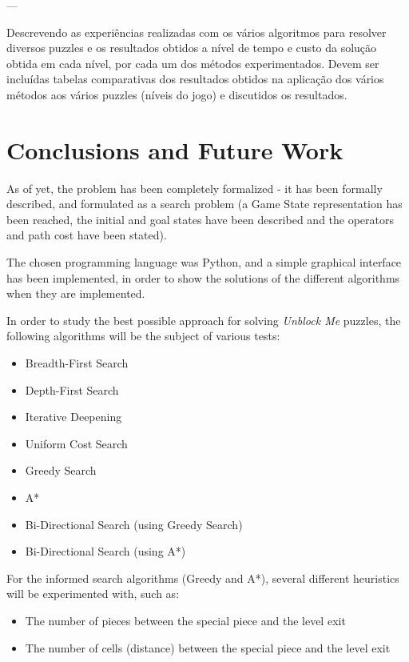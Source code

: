 \documentclass[conference]{IEEEtran}
\begin{document}
---

Descrevendo as experiências realizadas com os vários algoritmos para resolver diversos puzzles e os resultados obtidos a nível de tempo e custo da solução obtida em cada nível, por cada um dos métodos experimentados. Devem ser incluídas tabelas comparativas dos resultados obtidos na aplicação dos vários métodos aos vários puzzles (níveis do jogo) e discutidos os resultados.

\section{Conclusions and Future Work}
As of yet, the problem has been completely formalized - it has been formally described, and formulated as a search problem (a Game State representation has been reached, the initial and goal states have been described and the operators and path cost have been stated).

The chosen programming language was Python, and a simple graphical interface has been implemented, in order to show the solutions of the different algorithms when they are implemented.

In order to study the best possible approach for solving \textit{Unblock Me} puzzles, the following algorithms will be the subject of various tests:
\begin{itemize}
    \item Breadth-First Search
    \item Depth-First Search
    \item Iterative Deepening
    \item Uniform Cost Search
    \item Greedy Search
    \item A*
    \item Bi-Directional Search (using Greedy Search)
    \item Bi-Directional Search (using A*)
\end{itemize}

For the informed search algorithms (Greedy and A*), several different heuristics will be experimented with, such as:

\begin{itemize}
    \item The number of pieces between the special piece and the level exit
    \item The number of cells (distance) between the special piece and the level exit
\end{itemize}
\end{document}
